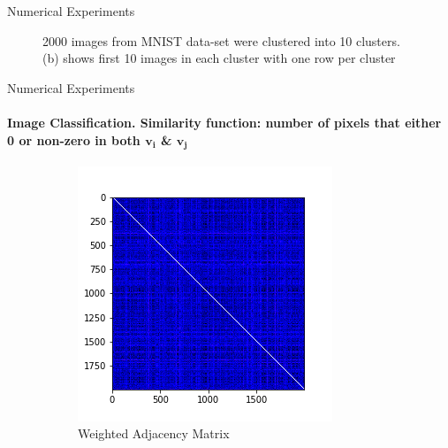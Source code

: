 \documentclass[10pt,a4paper, nocenter]{beamer}
\begin{document}
\begin{frame}{Numerical Experiments}
\begin{figure}[h]
\begin{center}
			\end{center}
			\caption{2000 images from MNIST data-set were clustered into 10 clusters. (b) shows first 10 images in each cluster with one row per cluster}
			\label{fig:mnistWImages2}
		\end{figure}
		
	\end{frame}
	
	\begin{frame}{Numerical Experiments}
		\framesubtitle{Image Classification. Similarity function: number of pixels that either 0 or non-zero in both $\mathbf{v_i}$ \& $\mathbf{v_j}$}
		\begin{figure}[h]
			\begin{center}

				\begin{subfigure}[b]{0.45\textwidth}
					\centering
					\includegraphics[width=\textwidth]{../../images/w_hamming.png}
					\caption{Weighted Adjacency Matrix}
					\label{fig:w_hamming}
				\end{subfigure}           
				\begin{subfigure}[b]{0.45\textwidth}
					\centering

\end{subfigure}
\end{center}
\end{figure}
\end{frame}
\end{document}
